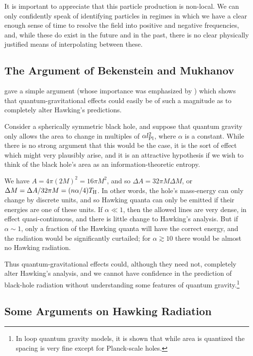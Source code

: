 \documentclass[12pt]{article}
\begin{document}
It is important to appreciate that this particle production is non-local.  We can only confidently speak of identifying particles in regimes in which we have a clear enough sense of time to resolve the field into positive and negative frequencies, and, while these do exist in the future and in the past, there is no clear physically justified means of interpolating between these.


\subsection{The Argument of Bekenstein and Mukhanov}

\citet{Bekenstein:1995ju} gave a simple argument (whose importance was emphasized by \citet{Ashtekar:1998}) which shows that quantum-gravitational effects could easily be of such a magnitude as to completely alter Hawking's predictions.

Consider a spherically symmetric black hole, and suppose that quantum gravity only allows the area to change in multiples of $\alpha l_{\rm Pl}^2$, where $\alpha$ is a constant.  While there is no strong argument that this would be the case, it is the sort of effect which might very plausibly arise, and it is an attractive hypothesis if we wish to think of the black hole's area as an information-theoretic entropy.

We have $A=4\pi (2M)^2=16\pi M^2$, and so $\Delta A=32\pi M\Delta M$, or $\Delta M=\Delta A/32\pi M=(n\alpha /4)T_{\rm H}$.  In other words, the hole's mass-energy can only change by discrete units, and so Hawking quanta can only be emitted if their energies are one of these units.  If $\alpha\ll 1$, then the allowed lines are very dense, in effect quasi-continuous, and there is little change to Hawking's analysis.  But if $\alpha \sim 1$, only a fraction of the Hawking quanta will have the correct energy, and the radiation would be significantly curtailed; for $\alpha\gtrsim 10$ there would be almost no Hawking radiation.

Thus quantum-gravitational effects could, although they need not, completely alter Hawking's analysis, and we cannot have confidence in the prediction of black-hole radiation without understanding some features of quantum gravity.\footnote{In loop quantum gravity models, it is shown that while area is quantized the spacing is very fine except for Planck-scale holes.}

\subsection{Some Arguments on Hawking Radiation}
\end{document}
